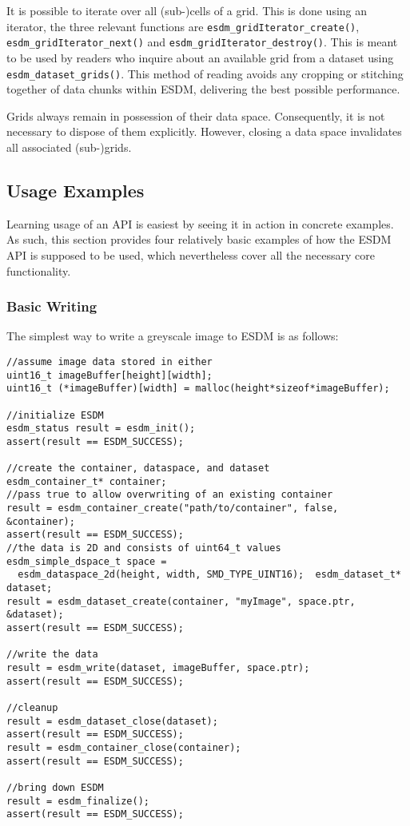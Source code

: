 It is possible to iterate over all (sub-)cells of a grid. 
This is done using an iterator, the three relevant functions are \lstinline|esdm_gridIterator_create()|, \lstinline|esdm_gridIterator_next()| and \lstinline|esdm_gridIterator_destroy()|. 
This is meant to be used by readers who inquire about an available grid from a dataset using \lstinline|esdm_dataset_grids()|. 
This method of reading avoids any cropping or stitching together of data chunks within ESDM, delivering the best possible performance.

Grids always remain in possession of their data space. 
Consequently, it is not necessary to dispose of them explicitly. 
However, closing a data space invalidates all associated (sub-)grids.

\subsection{Usage Examples}%
\label{sec:user-guides:usage-example}
Learning usage of an API is easiest by seeing it in action in concrete examples. 
As such, this section provides four relatively basic examples of how the ESDM API is supposed to be used, which nevertheless cover all the necessary core functionality.

\subsubsection{Basic Writing}
The simplest way to write a greyscale image to ESDM is as follows:

\begin{lstlisting}
//assume image data stored in either
uint16_t imageBuffer[height][width];
uint16_t (*imageBuffer)[width] = malloc(height*sizeof*imageBuffer);

//initialize ESDM
esdm_status result = esdm_init();
assert(result == ESDM_SUCCESS);

//create the container, dataspace, and dataset
esdm_container_t* container;
//pass true to allow overwriting of an existing container
result = esdm_container_create("path/to/container", false, &container); 
assert(result == ESDM_SUCCESS);
//the data is 2D and consists of uint64_t values
esdm_simple_dspace_t space = 
  esdm_dataspace_2d(height, width, SMD_TYPE_UINT16);  esdm_dataset_t* dataset;
result = esdm_dataset_create(container, "myImage", space.ptr, &dataset);
assert(result == ESDM_SUCCESS);

//write the data
result = esdm_write(dataset, imageBuffer, space.ptr);
assert(result == ESDM_SUCCESS);

//cleanup
result = esdm_dataset_close(dataset);
assert(result == ESDM_SUCCESS);
result = esdm_container_close(container);
assert(result == ESDM_SUCCESS);

//bring down ESDM
result = esdm_finalize();
assert(result == ESDM_SUCCESS);
\end{lstlisting}

